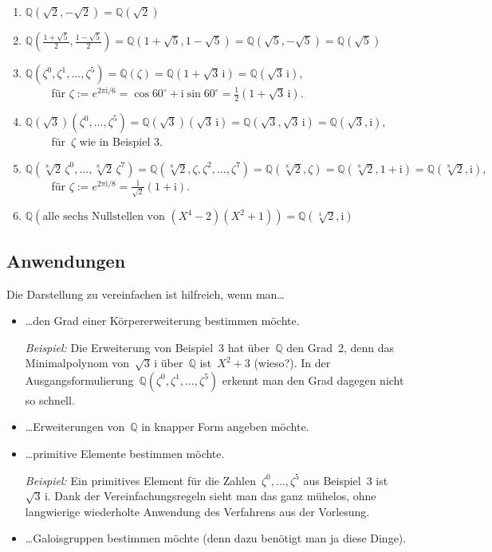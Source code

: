 \documentclass[12pt,a4paper,ngerman]{scrartcl}
\newcommand{\QQ}{\mathbb{Q}}
\renewcommand{\i}{\mathrm{i}}
\theoremstyle{definition}
\theoremstyle{plain}
\theoremstyle{remark}
\begin{document}
\begin{enumerate}
\item $\QQ(\sqrt{2}, {-}\sqrt{2}) = \QQ(\sqrt{2})$
\item $\QQ(\frac{1 + \sqrt{5}}{2}, \frac{1 - \sqrt{5}}{2}) = \QQ(1+\sqrt{5},
1-\sqrt{5}) = \QQ(\sqrt{5},-\sqrt{5}) = \QQ(\sqrt{5})$
\item $\QQ(\zeta^0,\zeta^1,\ldots,\zeta^5) = \QQ(\zeta) = \QQ(1
+ \sqrt{3}\,\i) = \QQ(\sqrt{3}\,\i),$ \\[0.3em]
${\qquad}$ für $\zeta := e^{2 \pi \i/6} = \cos 60^\circ + \i \sin 60^\circ =
\frac{1}{2}(1 + \sqrt{3}\,\i)$.
\item $\QQ(\sqrt{3})(\zeta^0,\ldots,\zeta^5) = \QQ(\sqrt{3})(\sqrt{3}\,\i) =
\QQ(\sqrt{3},\sqrt{3}\,\i) = \QQ(\sqrt{3},\i),$ \\[0.3em]
${\qquad}$ für~$\zeta$ wie in Beispiel 3.
\item
$\QQ(\sqrt[8]{2}\,\zeta^0, \ldots, \sqrt[8]{2}\,\zeta^7) = \QQ(\sqrt[8]{2},
\zeta, \zeta^2, \ldots, \zeta^7) = \QQ(\sqrt[8]{2}, \zeta) = \QQ(\sqrt[8]{2}, 1 + \i) = \QQ(\sqrt[8]{2},
\i),$ \\[0.3em]
${\qquad}$ für $\zeta := e^{2 \pi \i/8} = \frac{1}{\sqrt{2}}(1 + \i)$.
\item $\QQ(\text{alle sechs Nullstellen von~$(X^4 - 2) (X^2 + 1)$}) =
\QQ(\sqrt[4]{2}, \i)$
\end{enumerate}

\newpage

\subsection*{Anwendungen}

Die Darstellung zu vereinfachen ist hilfreich, wenn man\ldots
\begin{itemize}
\item \ldots den Grad einer Körpererweiterung bestimmen
möchte.

\emph{Beispiel:} Die Erweiterung von Beispiel~3 hat über~$\QQ$ den Grad~2, denn das
Minimalpolynom von~$\sqrt{3}\,\i$ über~$\QQ$ ist~$X^2 + 3$ (wieso?). In der
Ausgangsformulierung~$\QQ(\zeta^0,\zeta^1,\ldots,\zeta^5)$ erkennt man den Grad
dagegen nicht so schnell.

\item \ldots Erweiterungen von~$\QQ$ in knapper Form angeben möchte.

\item \ldots primitive Elemente bestimmen möchte.

\emph{Beispiel:} Ein primitives Element für die Zahlen~$\zeta^0,\ldots,\zeta^5$
aus Beispiel~3 ist~$\sqrt{3}\,\i$. Dank der Vereinfachungsregeln sieht man das ganz
mühelos, ohne langwierige wiederholte Anwendung des Verfahrens aus der
Vorlesung.

\item \ldots Galoisgruppen bestimmen möchte (denn dazu benötigt man ja diese
Dinge).
\end{itemize}
\end{document}
